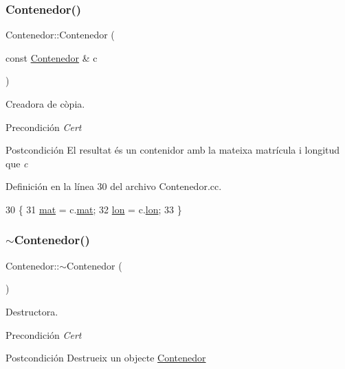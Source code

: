 \subsubsection{\texorpdfstring{Contenedor()}{Contenedor()}\hspace{0.1cm}{\footnotesize\ttfamily [3/3]}}
{\footnotesize\ttfamily Contenedor\+::\+Contenedor (\begin{DoxyParamCaption}\item[{const \hyperlink{class_contenedor}{Contenedor} \&}]{c }\end{DoxyParamCaption})}



Creadora de còpia. 

\begin{DoxyPrecond}{Precondición}
{\itshape Cert} 
\end{DoxyPrecond}
\begin{DoxyPostcond}{Postcondición}
El resultat és un contenidor amb la mateixa matrícula i longitud que {\itshape c} 
\end{DoxyPostcond}


Definición en la línea 30 del archivo Contenedor.\+cc.


\begin{DoxyCode}
30                                           \{
31   \hyperlink{class_contenedor_a219718cff2c0f94314defbf8d747bfa9}{mat} = c.\hyperlink{class_contenedor_a219718cff2c0f94314defbf8d747bfa9}{mat};
32   \hyperlink{class_contenedor_a364e04e5a1c7787463981f192f48e4ce}{lon} = c.\hyperlink{class_contenedor_a364e04e5a1c7787463981f192f48e4ce}{lon};
33 \}
\end{DoxyCode}
\mbox{\label{class_contenedor_a3648194b1174752cb24967d1c53787af}} 
\subsubsection{\texorpdfstring{$\sim$\+Contenedor()}{~Contenedor()}}
{\footnotesize\ttfamily Contenedor\+::$\sim$\+Contenedor (\begin{DoxyParamCaption}{ }\end{DoxyParamCaption})}



Destructora. 

\begin{DoxyPrecond}{Precondición}
{\itshape Cert} 
\end{DoxyPrecond}
\begin{DoxyPostcond}{Postcondición}
Destrueix un objecte \hyperlink{class_contenedor}{Contenedor} 
\end{DoxyPostcond}


